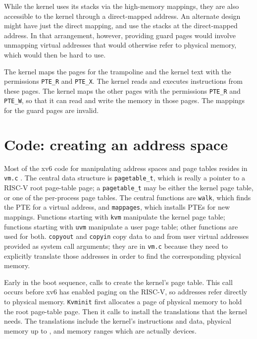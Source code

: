 While the kernel uses its stacks via the high-memory mappings, they
are also accessible to the kernel through a direct-mapped address. An
alternate design might have just the direct mapping, and use the
stacks at the direct-mapped address. In that arrangement, however,
providing guard pages would involve unmapping virtual addresses that
would otherwise refer to physical memory, which would then be hard to
use.

The kernel maps the pages for the trampoline and the kernel text with
the permissions
\lstinline{PTE_R}
and
\lstinline{PTE_X}.
The kernel reads and executes instructions from these pages.
The kernel maps the other pages with the permissions
\lstinline{PTE_R}
and
\lstinline{PTE_W},
so that it can read and write the memory in those pages.
The mappings for the guard pages are invalid.


\section{Code: creating an address space}

Most of the xv6 code for manipulating address spaces and
page tables resides in {\tt vm.c}
.
The central data structure is {\tt pagetable\_t}, which
is really a pointer to a RISC-V root page-table page;
a {\tt pagetable\_t} may be either the kernel
page table, or one of the per-process page tables.
The central functions are {\tt walk},
which finds the PTE for a virtual address,
and {\tt mappages}, which installs PTEs for new mappings.
Functions starting with {\tt kvm} manipulate
the kernel page table; functions starting with {\tt uvm}
manipulate a user page table; other functions are
used for both.
{\tt copyout} and {\tt copyin} copy data to and from
user virtual addresses provided as system call arguments;
they are in {\tt vm.c} because they need to explicitly
translate those addresses in order to find the corresponding
physical memory.

Early in the boot sequence,
calls
to create the kernel's page table.
This call occurs before xv6 has enabled paging on the RISC-V,
so addresses refer directly to physical memory.
\lstinline{Kvminit}
first allocates a page of physical memory to hold the root page-table page.
Then it calls
to install the translations that the kernel needs.
The translations include the kernel's
instructions and data, physical memory up to
,
and memory ranges which are actually devices.

